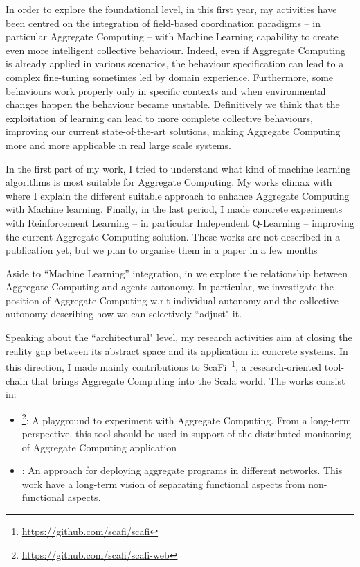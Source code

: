 \documentclass[12pt]{article}
\begin{document}
In order to explore the foundational level, in this first year, 
 my activities have been centred on the integration of field-based coordination paradigms 
 -- in particular Aggregate Computing -- with Machine Learning capability 
 to create even more intelligent collective behaviour.
%
Indeed, even if Aggregate Computing is already applied in various scenarios,
 the behaviour specification can lead to
 a complex fine-tuning sometimes led by domain experience.
%
Furthermore, some behaviours work properly only in specific contexts and when environmental
 changes happen the behaviour became unstable.
%
Definitively we think that the exploitation of 
 learning can lead to more complete collective behaviours, 
 improving our current state-of-the-art solutions, making Aggregate 
 Computing more and more applicable in real large scale systems.

In the first part of my work, I tried to understand what 
 kind of machine learning algorithms is most suitable for Aggregate Computing.
%
My works climax with \textit{} where I explain the different suitable approach
 to enhance Aggregate Computing with Machine learning.
%
Finally, in the last period, I made concrete experiments with 
 Reinforcement Learning -- in particular Independent Q-Learning -- 
 improving the current Aggregate Computing solution. 
 These works are not described in a publication yet, but we plan to organise them in a paper in a 
 few months

Aside to ``Machine Learning'' integration, in \textit{} 
 we explore the relationship between Aggregate Computing and agents autonomy. In particular, 
 we investigate the position of Aggregate Computing 
 w.r.t individual autonomy and the collective autonomy describing how we can selectively ``adjust" it. 

Speaking about the ``architectural" level, my research activities aim at closing the reality gap between
 its abstract space and its application in concrete systems. 
%
In this direction, I made mainly contributions 
 to ScaFi~\cite{scafi}\footnote{\url{https://github.com/scafi/scafi}}, 
 a research-oriented tool-chain that brings Aggregate Computing into the Scala world.
 The works consist in:

\begin{itemize}
  \item \textit{}\footnote{\url{https://github.com/scafi/scafi-web}}: 
	A playground to experiment with Aggregate Computing. From a long-term perspective, this tool should be used in support of
  the distributed monitoring of Aggregate Computing application
  \item \textit{}: 
	An approach for deploying aggregate programs in different networks. This work have a long-term vision of separating functional aspects from non-functional aspects.
\end{itemize}
\end{document}
